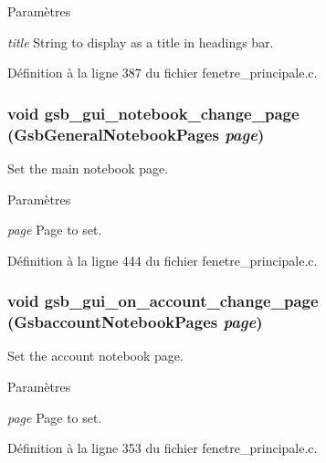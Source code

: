 \begin{DoxyParams}{Paramètres}
\item[{\em title}]String to display as a title in headings bar. \end{DoxyParams}


Définition à la ligne 387 du fichier fenetre\_\-principale.c.

\subsubsection[{gsb\_\-gui\_\-notebook\_\-change\_\-page}]{\setlength{\rightskip}{0pt plus 5cm}void gsb\_\-gui\_\-notebook\_\-change\_\-page ({\bf GsbGeneralNotebookPages} {\em page})}\label{fenetre__principale_8c_ae7636cbe5e0d42949754b905193ce99d}
Set the main notebook page.


\begin{DoxyParams}{Paramètres}
\item[{\em page}]Page to set. \end{DoxyParams}


Définition à la ligne 444 du fichier fenetre\_\-principale.c.

\subsubsection[{gsb\_\-gui\_\-on\_\-account\_\-change\_\-page}]{\setlength{\rightskip}{0pt plus 5cm}void gsb\_\-gui\_\-on\_\-account\_\-change\_\-page ({\bf GsbaccountNotebookPages} {\em page})}\label{fenetre__principale_8c_a94dc9871dffaaec186f7933619418064}
Set the account notebook page.


\begin{DoxyParams}{Paramètres}
\item[{\em page}]Page to set. \end{DoxyParams}


Définition à la ligne 353 du fichier fenetre\_\-principale.c.

